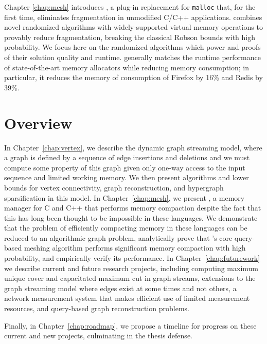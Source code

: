 Chapter \ref{chap:mesh} introduces \Mesh, a plug-in replacement for \texttt{malloc}
that, for the first time, eliminates fragmentation in unmodified
C/C++ applications. \Mesh combines novel randomized algorithms with
widely-supported virtual memory operations to provably reduce
fragmentation, breaking the classical Robson bounds with high
probability. We focus here on the randomized algorithms which power \Mesh and proofs of their solution quality and runtime.  \Mesh generally matches the runtime performance of
state-of-the-art memory allocators while reducing memory consumption;
in particular, it reduces the memory of consumption of Firefox by 16\%
and Redis by 39\%.

\section{Overview}

In Chapter~\ref{chap:vertex}, we describe the dynamic graph streaming model, where a graph is defined by a sequence of edge insertions and deletions and we must compute some property of this graph given only one-way access to the input sequence and limited working memory.  We then present algorithms and lower bounds for vertex connectivity, graph reconstruction, and hypergraph sparsification in this model.  In Chapter~\ref{chap:mesh}, we present \Mesh, a memory manager for C and C++ that performs memory compaction despite the fact that this has long been thought to be impossible in these languages. We demonstrate that the problem of efficiently compacting memory in these languages can be reduced to an algorithmic graph problem, analytically prove that \Mesh's core query-based meshing algorithm performs significant memory compaction with high probability, and empirically verify its performance.  In Chapter~\ref{chap:futurework} we describe current and future research projects, including computing maximum unique cover and capacitated maximum cut in graph streams, extensions to the graph streaming model where edges exist at some times and not others, a network measurement system that makes efficient use of limited measurement resources, and query-based graph reconstruction problems.

Finally, in Chapter~\ref{chap:roadmap}, we propose a timeline for progress on these current and new projects, culminating in the thesis defense.